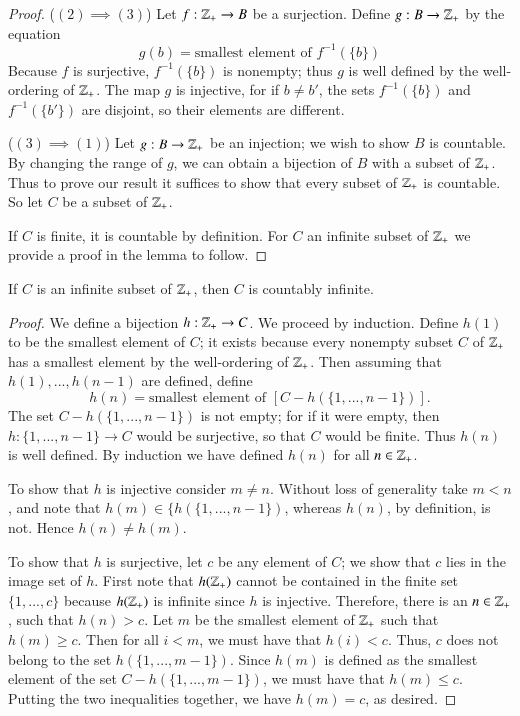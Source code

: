 \documentclass[12pt, a4paper, oneside, openright, titlepage]{book}
\begin{document}
\begin{appendices}
\begin{proof}
        ($(2)\implies (3)$) Let $f:\mathbb Z_+\rightarrow B$ be a surjection. Define $g:B\rightarrow \mathbb Z_+$ by the equation \begin{equation*}
            g(b) = \text{smallest element of $f^{-1}(\{b\})$}
        \end{equation*}
        Because $f$ is surjective, $f^{-1}(\{b\})$ is nonempty; thus $g$ is well defined by the well-ordering of $\mathbb Z_+$. The map $g$ is injective, for if $b \neq b'$, the sets $f^{-1}(\{b\})$ and $f^{-1}(\{b'\})$ are disjoint, so their elements are different.

        ($(3)\implies (1)$) Let $g:B\rightarrow \mathbb Z_+$ be an injection; we wish to show $B$ is countable. By changing the range of $g$, we can obtain a bijection of $B$ with a subset of $\mathbb Z_+$. Thus to prove our result it suffices to show that every subset of $\mathbb Z_+$ is countable. So let $C$ be a subset of $\mathbb Z_+$.

        If $C$ is finite, it is countable by definition. For $C$ an infinite subset of $\mathbb Z_+$ we provide a proof in the lemma to follow.
    \end{proof}


    \begin{lemma}
        If $C$ is an infinite subset of $\mathbb Z_+$, then $C$ is countably infinite.
    \end{lemma}
    \begin{proof}
        We define a bijection $h:\mathbb Z_+\rightarrow C$. We proceed by induction. Define $h(1)$ to be the smallest element of $C$; it exists because every nonempty subset $C$ of $\mathbb Z_+$ has a smallest element by the well-ordering of $\mathbb Z_+$. Then assuming that $h(1),...,h(n-1)$ are defined, define \begin{equation*}
            h(n) = \text{smallest element of } [C-h(\{1,...,n-1\})].
        \end{equation*}
        The set $C-h(\{1,...,n-1\})$ is not empty; for if it were empty, then $h:\{1,...,n-1\}\rightarrow C$ would be surjective, so that $C$ would be finite. Thus $h(n)$ is well defined. By induction we have defined $h(n)$ for all $n \in \mathbb Z_+$.


        To show that $h$ is injective consider $m \neq n$. Without loss of generality take $m < n$, and note that $h(m) \in \{h(\{1,...,n-1\})$, whereas $h(n)$, by definition, is not. Hence $h(n) \neq h(m)$.

        To show that $h$ is surjective, let $c$ be any element of $C$; we show that $c$ lies in the image set of $h$. First note that $h(\mathbb Z_+)$ cannot be contained in the finite set $\{1,...,c\}$ because $h(\mathbb Z_+)$ is infinite since $h$ is injective. Therefore, there is an $n \in \mathbb Z_+$, such that $h(n) > c$. Let $m$ be the smallest element of $\mathbb Z_+$ such that $h(m) \geq c$. Then for all $i < m$, we must have that $h(i) < c$. Thus, $c$ does not belong to the set $h(\{1,...,m-1\})$. Since $h(m)$ is defined as the smallest element of the set $C-h(\{1,...,m-1\})$, we must have that $h(m) \leq c$. Putting the two inequalities together, we have $h(m) = c$, as desired.
    \end{proof}



\end{appendices}
\end{document}
